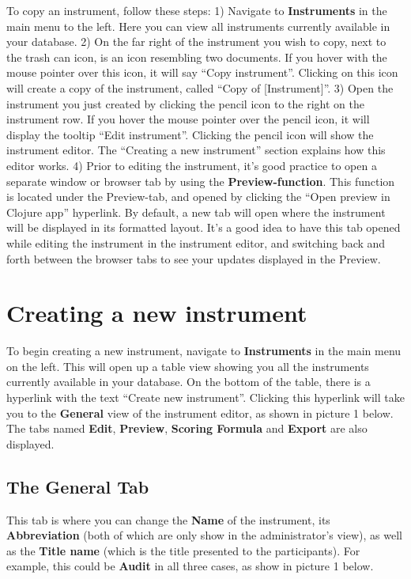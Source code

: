 \documentclass[
]{book}
\begin{document}
To copy an instrument, follow these steps:
1) Navigate to \textbf{Instruments} in the main menu to the left. Here you can view all instruments currently available in your database.
2) On the far right of the instrument you wish to copy, next to the trash can icon, is an icon resembling two documents. If you hover with the mouse pointer over this icon, it will say ``Copy instrument''. Clicking on this icon will create a copy of the instrument, called ``Copy of {[}Instrument{]}''.
3) Open the instrument you just created by clicking the pencil icon to the right on the instrument row. If you hover the mouse pointer over the pencil icon, it will display the tooltip ``Edit instrument''. Clicking the pencil icon will show the instrument editor. The ``Creating a new instrument'' section explains how this editor works.
4) Prior to editing the instrument, it's good practice to open a separate window or browser tab by using the \textbf{Preview-function}. This function is located under the Preview-tab, and opened by clicking the ``Open preview in Clojure app'' hyperlink. By default, a new tab will open where the instrument will be displayed in its formatted layout. It's a good idea to have this tab opened while editing the instrument in the instrument editor, and switching back and forth between the browser tabs to see your updates displayed in the Preview.

\section{Creating a new instrument}\label{creating-a-new-instrument}

To begin creating a new instrument, navigate to \textbf{Instruments} in the main menu on the left. This will open up a table view showing you all the instruments currently available in your database. On the bottom of the table, there is a hyperlink with the text ``Create new instrument''. Clicking this hyperlink will take you to the \textbf{General} view of the instrument editor, as shown in picture 1 below. The tabs named \textbf{Edit}, \textbf{Preview}, \textbf{Scoring Formula} and \textbf{Export} are also displayed.

\subsection{The General Tab}\label{the-general-tab}

This tab is where you can change the \textbf{Name} of the instrument, its \textbf{Abbreviation} (both of which are only show in the administrator's view), as well as the \textbf{Title name} (which is the title presented to the participants).
For example, this could be \textbf{Audit} in all three cases, as show in picture 1 below.
\end{document}
